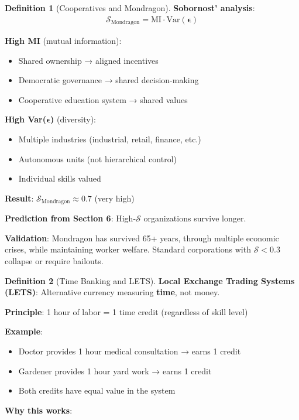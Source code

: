 \documentclass[11pt,a4paper]{article}
\theoremstyle{definition}
\newtheorem{definition}{Definition}[section]
\theoremstyle{remark}
\begin{document}
\begin{small}
\begin{enumerate}
\begin{definition}[Cooperatives and Mondragon]
\textbf{Sobornost' analysis}:
\begin{align}
\mathcal{S}_{\text{Mondragon}} = \text{MI} \cdot \text{Var}(\boldsymbol{\epsilon})
\end{align}

\textbf{High MI} (mutual information):
\begin{itemize}
    \item Shared ownership → aligned incentives
    \item Democratic governance → shared decision-making
    \item Cooperative education system → shared values
\end{itemize}

\textbf{High Var(\(\boldsymbol{\epsilon}\))} (diversity):
\begin{itemize}
    \item Multiple industries (industrial, retail, finance, etc.)
    \item Autonomous units (not hierarchical control)
    \item Individual skills valued
\end{itemize}

\textbf{Result}: \(\mathcal{S}_{\text{Mondragon}} \approx 0.7\) (very high)

\textbf{Prediction from Section 6}: High-\(\mathcal{S}\) organizations survive longer.

\textbf{Validation}: Mondragon has survived 65+ years, through multiple economic crises, while maintaining worker welfare. Standard corporations with \(\mathcal{S} < 0.3\) collapse or require bailouts.
\end{definition}

\begin{definition}[Time Banking and LETS]
\textbf{Local Exchange Trading Systems (LETS)}: Alternative currency measuring \textbf{time}, not money.

\textbf{Principle}: 1 hour of labor = 1 time credit (regardless of skill level)

\textbf{Example}:
\begin{itemize}
    \item Doctor provides 1 hour medical consultation → earns 1 credit
    \item Gardener provides 1 hour yard work → earns 1 credit
    \item Both credits have equal value in the system
\end{itemize}

\textbf{Why this works}:


\end{definition}
\end{enumerate}
\end{small}
\end{document}
